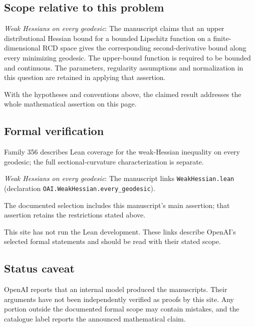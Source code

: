 \documentclass[11pt]{article}
\begin{document}
\subsection{Scope relative to this problem}
\textit{Weak Hessians on every geodesic}: The manuscript claims that an upper distributional Hessian bound for a bounded Lipschitz function on a finite-dimensional RCD space gives the corresponding second-derivative bound along every minimizing geodesic. The upper-bound function is required to be bounded and continuous. The parameters, regularity assumptions and normalization in this question are retained in applying that assertion.

With the hypotheses and conventions above, the claimed result addresses the whole mathematical assertion on this page.

\subsection{Formal verification}
Family 356 describes Lean coverage for the weak-Hessian inequality on every geodesic; the full sectional-curvature characterization is separate.

\textit{Weak Hessians on every geodesic}: The manuscript links \texttt{WeakHessian.lean} (declaration \texttt{OAI.WeakHessian.every\_geodesic}).

The documented selection includes this manuscript’s main assertion; that assertion retains the restrictions stated above.

This site has not run the Lean development. These links describe OpenAI’s selected formal statements and should be read with their stated scope.

\subsection{Status caveat}
OpenAI reports that an internal model produced the manuscripts. Their arguments have not been independently verified as proofs by this site. Any portion outside the documented formal scope may contain mistakes, and the catalogue label reports the announced mathematical claim.
\end{document}
